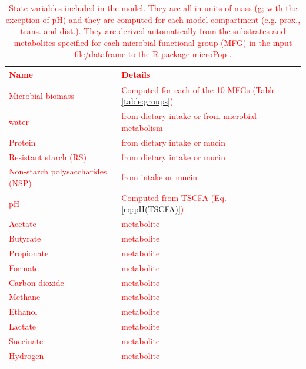 \documentclass[a4paper]{article}
\begin{document}
\begin{table}[ht]
    \caption{\textcolor{red}{State variables included in the model. They are all in units of mass (g; with the exception of pH) and they are computed for each model compartment (e.g. prox., trans. and dist.). They are derived automatically from the substrates and metabolites specified for each microbial functional group (MFG) in the input file/dataframe to the R package microPop \cite{Kettle2018}.}}
\textcolor{red}{
\begin{tabular}{|l|l|l|}
\hline
Name &  Details\\
\hline
Microbial biomass & Computed for each of the 10  MFGs (Table \ref{table:groups})\\
\hline
water  & from dietary intake or from microbial metabolism \\
Protein  & from dietary intake or mucin\\
Resistant starch (RS)  & from dietary intake or mucin\\
Non-starch polysaccharides (NSP)  & from intake or mucin\\
\hline
pH & Computed from TSCFA (Eq. \ref{eq:pH(TSCFA)})\\
\hline
Acetate &   metabolite\\
Butyrate &   metabolite\\
Propionate  &  metabolite\\
Formate &  metabolite \\
Carbon dioxide &  metabolite \\
Methane &  metabolite \\
Ethanol &  metabolite \\
Lactate &  metabolite \\
Succinate &  metabolite\\
Hydrogen &  metabolite\\
\hline
\end{tabular}
}
\label{table:stateVariables}
\end{table}
\end{document}
